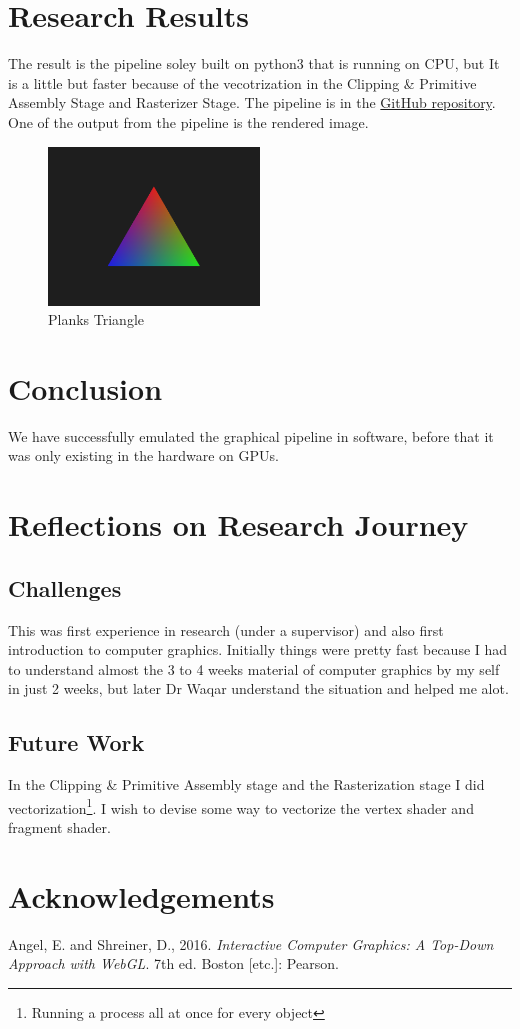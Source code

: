 \documentclass[a4paper]{article}
\theoremstyle{mytheoremstyle}
\theoremstyle{mytheoremstyle}
\theoremstyle{myproblemstyle}
\begin{document}
\section{Research Results}
The result is the pipeline soley built on python3 that is running on CPU, but It is a little but faster because of the vecotrization in the Clipping \& Primitive Assembly Stage and Rasterizer Stage. The pipeline is in the \href{https://GitHub.com/ai-maq/Computer-Graphics-Tehqiq/}{GitHub repository}. One of the output from the pipeline is the rendered image.

\begin{figure}[h]
    \center
    \includegraphics[width=0.5\textwidth]{tricolor-triangle.png}
    \caption{Planks Triangle}
\end{figure}


\section{Conclusion}
We have successfully emulated the graphical pipeline in software, before that it was only existing in the hardware on GPUs.

\section{Reflections on Research Journey}
\subsection{Challenges}
This was first experience in research (under a supervisor) and also first introduction to computer graphics. Initially things were pretty fast because I had to understand almost the 3 to 4 weeks material of computer graphics by my self in just 2 weeks, but later Dr Waqar understand the situation and helped me alot.

\subsection{Future Work}
In the Clipping \& Primitive Assembly stage and the Rasterization stage I did vectorization\footnote{Running a process all at once for every object}. I wish to devise some way to vectorize the vertex shader and fragment shader.

\section{Acknowledgements}
\begin{thebibliography}{9}
    Angel, E. and Shreiner, D., 2016. \emph{Interactive Computer Graphics: A Top-Down Approach with WebGL}. 7th ed. Boston [etc.]: Pearson.
\end{thebibliography}
\end{document}
